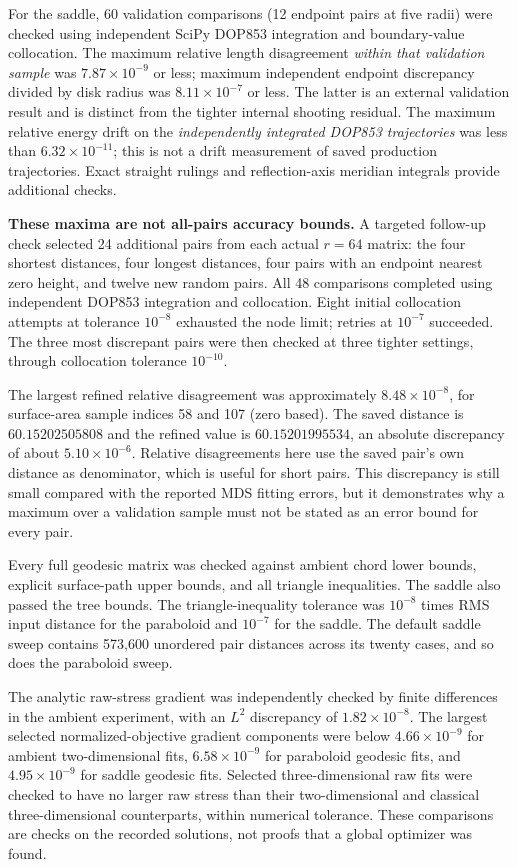 \documentclass[11pt]{article}
\theoremstyle{remark}\newtheorem{remark}[proposition]{Remark}
\begin{document}
For the saddle, 60 validation comparisons (12 endpoint pairs at five radii)
were checked using independent SciPy DOP853 integration and boundary-value
collocation. The maximum relative length disagreement \emph{within that
validation sample} was $7.87\times10^{-9}$ or less; maximum independent
endpoint discrepancy divided by disk radius was $8.11\times10^{-7}$ or less.
The latter is an external validation result and is distinct from the tighter
internal shooting residual. The maximum relative energy drift on the
\emph{independently integrated DOP853 trajectories} was less than
$6.32\times10^{-11}$; this is not a drift measurement of saved production
trajectories. Exact straight rulings and reflection-axis meridian
integrals provide additional checks.

\textbf{These maxima are not all-pairs accuracy bounds.} A targeted follow-up
check selected 24 additional pairs from each actual $r=64$ matrix: the four
shortest distances, four longest distances, four pairs with an endpoint nearest
zero height, and twelve new random pairs. All 48 comparisons completed using
independent DOP853 integration and collocation. Eight initial collocation
attempts at tolerance $10^{-8}$ exhausted the node limit; retries at
$10^{-7}$ succeeded. The three most discrepant pairs were then checked at
three tighter settings, through collocation tolerance $10^{-10}$.

The largest refined relative disagreement was approximately
$8.48\times10^{-8}$, for surface-area sample indices 58 and 107 (zero based).
The saved distance is $60.15202505808$ and the refined value is
$60.15201995534$, an absolute discrepancy of about $5.10\times10^{-6}$.
Relative disagreements here use the saved pair's own distance as denominator,
which is useful for short pairs. This discrepancy is still small compared
with the reported MDS fitting errors, but it demonstrates why a maximum over
a validation sample must not be stated as an error bound for every pair.

Every full geodesic matrix was checked against ambient chord lower bounds,
explicit surface-path upper bounds, and all triangle inequalities. The saddle
also passed the tree bounds. The triangle-inequality tolerance was $10^{-8}$
times RMS input distance for the paraboloid and $10^{-7}$ for the saddle.
The default saddle sweep contains 573,600 unordered pair distances across
its twenty cases, and so does the paraboloid sweep.

The analytic raw-stress gradient was independently checked by finite differences
in the ambient experiment, with an $L^2$ discrepancy of $1.82\times10^{-8}$.
The largest selected normalized-objective gradient components were below
$4.66\times10^{-9}$ for ambient two-dimensional fits,
$6.58\times10^{-9}$ for paraboloid geodesic fits, and
$4.95\times10^{-9}$ for saddle geodesic fits. Selected three-dimensional raw
fits were checked to have no larger raw stress than their two-dimensional
and classical three-dimensional counterparts, within numerical tolerance.
These comparisons are checks on the recorded solutions, not proofs that a
global optimizer was found.
\end{document}
